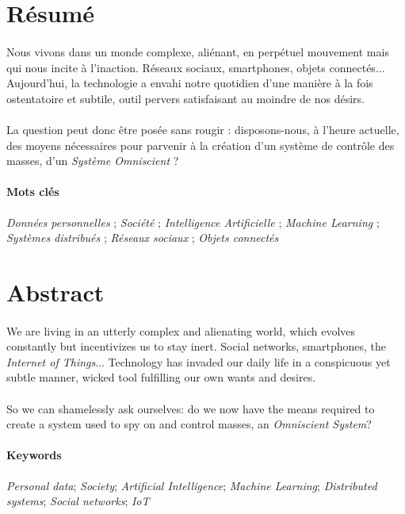 \section*{Résumé}

\paragraph{} Nous vivons dans un monde complexe, aliénant, en perpétuel mouvement mais qui
nous incite à l'inaction. Réseaux sociaux, smartphones, objets connectés... Aujourd'hui, la
technologie a envahi notre quotidien d'une manière à la fois ostentatoire et subtile, outil
pervers satisfaisant au moindre de nos désirs.

\paragraph{} La question peut donc être posée sans rougir : disposons-nous, à l'heure
actuelle, des moyens nécessaires pour parvenir à la création d'un système de contrôle des
masses, d'un \emph{Système Omniscient} ?

\paragraph{Mots clés}
\emph{Données personnelles} ;
\emph{Société} ;
\emph{Intelligence Artificielle} ;
\emph{Machine Learning} ;
\emph{Systèmes distribués} ;
\emph{Réseaux sociaux} ;
\emph{Objets connectés}


\section*{Abstract}

\paragraph{} We are living in an utterly complex and alienating world, which evolves constantly
but incentivizes us to stay inert. Social networks, smartphones, the \emph{Internet of Things}...
Technology has invaded our daily life in a conspicuous yet subtle manner, wicked tool fulfilling
our own wants and desires.

\paragraph{} So we can shamelessly ask ourselves: do we now have the means required to create
a system used to spy on and control masses, an \emph{Omniscient System}?

\paragraph{Keywords}
\emph{Personal data};
\emph{Society};
\emph{Artificial Intelligence};
\emph{Machine Learning};
\emph{Distributed systems};
\emph{Social networks};
\emph{IoT}
